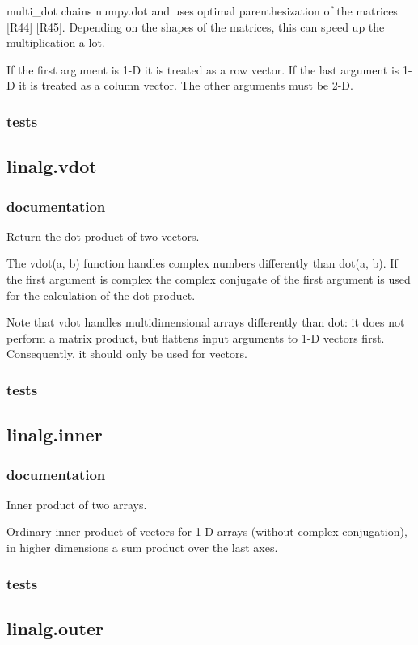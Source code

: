 multi\_dot chains numpy.dot and uses optimal parenthesization of the matrices [R44] [R45]. Depending on the shapes of the matrices, this can speed up the multiplication a lot.

If the first argument is 1-D it is treated as a row vector. If the last argument is 1-D it is treated as a column vector. The other arguments must be 2-D.
\subsubsection{tests}

\subsection{linalg.vdot}

\subsubsection{documentation}
Return the dot product of two vectors.

The vdot(a, b) function handles complex numbers differently than dot(a, b). If the first argument is complex the complex conjugate of the first argument is used for the calculation of the dot product.

Note that vdot handles multidimensional arrays differently than dot: it does not perform a matrix product, but flattens input arguments to 1-D vectors first. Consequently, it should only be used for vectors.
\subsubsection{tests}

\subsection{linalg.inner}
\subsubsection{documentation}
Inner product of two arrays.

Ordinary inner product of vectors for 1-D arrays (without complex conjugation), in higher dimensions a sum product over the last axes.

\subsubsection{tests}
\subsection{linalg.outer}
